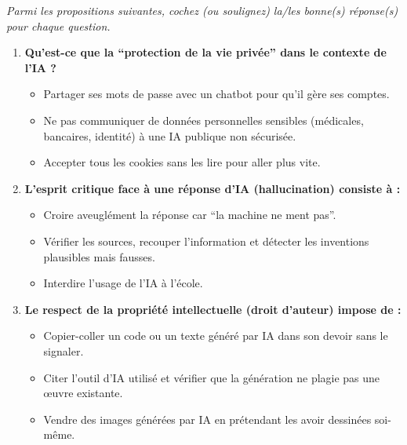 \documentclass[11pt]{article}
\begin{document}
\begin{exercice}
\emph{Parmi les propositions suivantes, cochez (ou soulignez) la/les bonne(s) réponse(s) pour chaque question.}
\begin{enumerate}
    \item \textbf{Qu'est-ce que la ``protection de la vie privée'' dans le contexte de l'IA ?}
    \begin{itemize}
        \item[a)] Partager ses mots de passe avec un chatbot pour qu'il gère ses comptes.
        \item[b)] Ne pas communiquer de données personnelles sensibles (médicales, bancaires, identité) à une IA publique non sécurisée.
        \item[c)] Accepter tous les cookies sans les lire pour aller plus vite.
    \end{itemize}
    \item \textbf{L'esprit critique face à une réponse d'IA (hallucination) consiste à :}
    \begin{itemize}
        \item[a)] Croire aveuglément la réponse car ``la machine ne ment pas''.
        \item[b)] Vérifier les sources, recouper l'information et détecter les inventions plausibles mais fausses.
        \item[c)] Interdire l'usage de l'IA à l'école.
    \end{itemize}
    \item \textbf{Le respect de la propriété intellectuelle (droit d'auteur) impose de :}
    \begin{itemize}
        \item[a)] Copier-coller un code ou un texte généré par IA dans son devoir sans le signaler.
        \item[b)] Citer l'outil d'IA utilisé et vérifier que la génération ne plagie pas une œuvre existante.
        \item[c)] Vendre des images générées par IA en prétendant les avoir dessinées soi-même.
    \end{itemize}
\end{enumerate}
\end{exercice}
\end{document}
